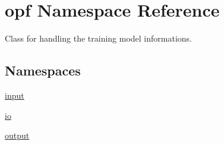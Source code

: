 \hypertarget{namespaceopf}{\section{opf Namespace Reference}
\label{namespaceopf}
}


Class for handling the training model informations.  


\subsection*{Namespaces}
\begin{DoxyCompactItemize}
\item 
 \hyperlink{namespaceopf_1_1input}{input}
\item 
 \hyperlink{namespaceopf_1_1io}{io}
\item 
 \hyperlink{namespaceopf_1_1output}{output}
\end{DoxyCompactItemize}
